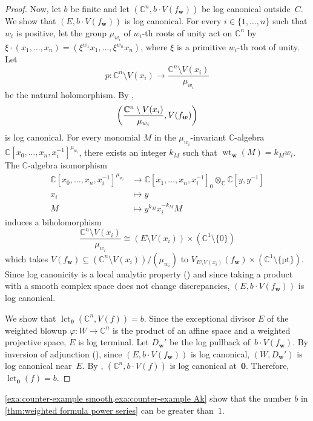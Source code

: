\documentclass[a4paper, 12pt, oneside]{article}
\theoremstyle{plain}
\theoremstyle{definition}
\theoremstyle{remark}
\numberwithin{theorem}{section}
\numberwithin{table}{section}
\numberwithin{equation}{theorem}
\begin{document}
\begin{proof}
Now, let $b$ be finite and let $(\mathbb C^n, b \cdot V(f_{\bm w}))$ be log canonical outside~$C$. We show that $(E, b \cdot V(f_{\bm w}))$ is log canonical. For every $i \in \{1, \ldots, n\}$ such that $w_i$ is positive, let the group $\mu_{w_i}$ of $w_i$-th roots of unity act on $\mathbb C^n$ by $\xi \cdot (x_1, \ldots, x_n) = (\xi^{w_1} x_1, \ldots, \xi^{w_n} x_n)$, where $\xi$ is a primitive $w_i$-th root of unity. Let
\[
p\colon \mathbb C^n \setminus V(x_i) \to \frac{\mathbb C^n \setminus V(x_i)}{\mu_{w_i}}
\]
be the natural holomorphism. By \cite[Theorem~8.12]{Kol97},
\[
\mleft(\frac{\mathbb C^n \setminus V(x_i)}{\mu_{w_i}}, V(f_{\bm w})\mright)
\]
is log canonical. For every monomial $M$ in the $\mu_{w_i}$-invariant $\mathbb C$-algebra $\mathbb C[x_0, \ldots, x_n, x_i^{-1}]^{\mu_{w_i}}$, there exists an integer $k_M$ such that $\operatorname{wt}_{\bm w}(M) = k_M w_i$. The $\mathbb C$-algebra isomorphism
\[
\begin{aligned}
  \mathbb C[x_0, \ldots, x_n, x_i^{-1}]^{\mu_{w_i}} & \to \mathbb C[x_1, \ldots, x_n, x_i^{-1}]_0 \otimes_{\mathbb C} \mathbb C[y, y^{-1}]\\
  x_i & \mapsto y\\
  M & \mapsto y^{k_M} x_i^{-k_M} M
\end{aligned}
\]
induces a biholomorphism
\[
\frac{\mathbb C^n \setminus V(x_i)}{\mu_{w_i}} \cong (E \setminus V(x_i)) \times (\mathbb C^1 \setminus \{0\})
\]
which takes $V(f_{\bm w}) \subseteq (\mathbb C^n \setminus V(x_i))/(\mu_{w_i})$ to $V_{E \setminus V(x_i)}(f_{\bm w}) \times (\mathbb C^1 \setminus \{\mathrm{pt}\})$. Since log canonicity is a local analytic property (\cite[Proposition~4.4.4]{Mat02}) and since taking a product with a smooth complex space does not change discrepancies, $(E, b \cdot V(f_{\bm w}))$ is log canonical.

We show that $\operatorname{lct}_{\bm 0}(\mathbb C^n, V(f)) = b$. Since the exceptional divisor $E$ of the weighted blowup $\varphi\colon W \to \mathbb C^n$ is the product of an affine space and a weighted projective space, $E$ is log terminal. Let $D_{\bm w}'$ be the log pullback of~$b \cdot V(f_{\bm w})$. By inversion of adjunction (\cite[Theorem~7.5]{Kol97}), since $(E, b \cdot V(f_{\bm w}))$ is log canonical, $(W, D_{\bm w}')$ is log canonical near~$E$. By \cite[Lemma~3.10.2]{Kol97}, $(\mathbb C^n, b \cdot V(f))$ is log canonical at~$\bm 0$. Therefore, $\operatorname{lct}_{\bm 0}(f) = b$.
\end{proof}

\cref{exa:counter-example smooth,exa:counter-example Ak} show that the number $b$ in \cref{thm:weighted formula power series} can be greater than~$1$.
\end{document}
